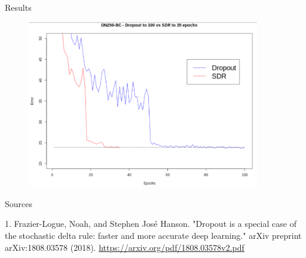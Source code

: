 \documentclass{beamer}
\begin{document}
\begin{frame}{Results}
\begin{figure}[h]
\includegraphics[width=0.9\textwidth]{img/dropout_vs_sdr}
\end{figure}
\end{frame}


\begin{frame}{Sources}

\begin{thebibliography}{0}

   1. Frazier-Logue, Noah, and Stephen José Hanson. "Dropout is a special case of the stochastic delta rule: faster and more accurate deep learning." arXiv preprint arXiv:1808.03578 (2018). \url{https://arxiv.org/pdf/1808.03578v2.pdf}
  
\end{thebibliography}

\end{frame}

 
 
 
\end{document}
